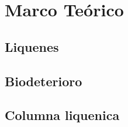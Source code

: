 \chapter{Marco Teórico}

\section{Liquenes}


\section{Biodeterioro}

\section{Columna liquenica}

\section{}

\section{}
